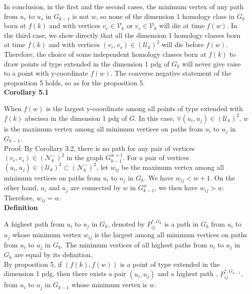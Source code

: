 \documentclass[a4paper,12pt]{article}
\numberwithin{equation}{section}
\begin{document}
	  In conclusion, in the first and the second cases, the minimum vertex of any path from $u_r$ to $u_s$ in $G_{k-1}$ is not $w$, so none of the dimension 1 homology class in $G_k$ born at $f(k)$ and with vertices $v_r \in \mathcal{V}_k$ or $v_s \in \mathcal{V}_k$ will die at time $f(w)$. In the third case, we show directly that all the dimension 1 homology classes born at time $f(k)$ and with vertices $(v_r,v_s) \in (\mathcal{U}_k)^2$ will die before $f(w)$. Therefore, the choice of some independent homology classes born at $f(k)$ to draw points of type extended in the dimension 1 pdg of $G_k$ will never give raise to a point with y-coordinate $f(w)$. The converse negative statement of the proposition 5 holds, so as for the proposition 5.\\

	\noindent \textbf{Corollary 5.1}
	
	When $f(w)$ is the largest y-coordinate among all points of type extended with $f(k)$ abscissa in the dimension 1 pdg of $G$. In this case, $\forall (u_i,u_j) \in (\mathcal{U}_k)^2$, $w$ is the maximum vertex among all minimum vertices on paths from $u_i$ to $u_j$ in $G_{k-1}$.\\
	
	\noindent Proof:
	By Corollary 3.2, there is no path for any pair of vertices $(v_r,v_s) \in (\mathcal{N}_k^-)^2$ in the graph $G^{w+1}_{k-1}$. 
	For a pair of vertices $(u_i,u_j) \in (\mathcal{U}_k)^2 \subset (\mathcal{N}_k^-)^2$, let $w_{ij}$ be the maximum vertex among all minimum vertices on paths from $u_i$ to $u_j$ in $G_k$. We have $w_{ij} < w+1$. On the other hand, $u_i$ and $u_j$ are connected by $w$ in $G^w_{k-1}$, we then have $w_{ij} > w$. Therefore, $w_{ij} = w$.\\
	
	\noindent \textbf{Definition}
	
	A highest path from $u_i$ to $u_j$ in $G_k$, denoted by $P_{ij}^{*,G_k}$ is a path in $G_k$ from $u_i$ to $u_j$ whose minimum vertex $w_{ij}$ is the largest among all minimum vertices on paths from $u_i$ to $u_j$ in $G_k$. The minimum vertices of all highest paths from $u_i$ to $u_j$ in $G_k$ are equal by its definition.\\
	
	By proposition 5, if $(f(k),f(w))$ is a point of type extended in the dimension 1 pdg, then there exists a pair $(u_i,u_j)$ and a highest path , $P_{ij}^{*,G_{k-1}}$, from $u_i$ to $u_j$ in $G_{k-1}$ whose minimum vertex is $w$.\\			
	
\end{document}
